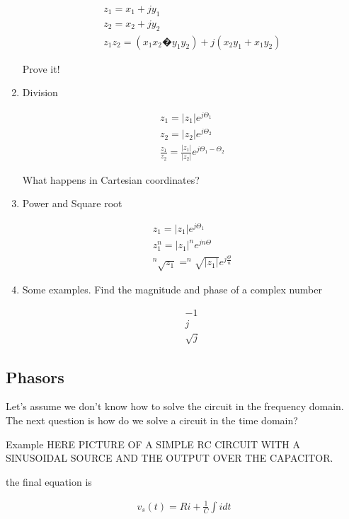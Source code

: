 \begin{enumerate}
\begin{eqnarray}
z_1=x_1 + j y_1 \\
z_2=x_2 + j y_2 \\ 
z_1 z_2 = (x_1 x_2 � y_1 y_2) + j ( x_2 y_1 + x_1 y_2)
\end{eqnarray}
  
Prove it!


\item Division


\begin{eqnarray}
z_1=|z_1| e^{j \Theta_1} \\
z_2=|z_2| e^{j \Theta_2} \\
\frac{z_1}{ z_2} = \frac{|z_1|}{|z_2|} e^{j \Theta_1 -\Theta_2}
\end{eqnarray}
  

What happens in Cartesian coordinates?


\item Power and Square root


\begin{eqnarray}
z_1=|z_1| e^{j \Theta_1} \\
z_1^n=|z_1|^n e^{j n \Theta} \\
^n\sqrt{z_1}= ^n\sqrt{|z_1|} e^{j\frac{\Theta}{n}}
\end{eqnarray}




\item Some examples. Find the magnitude and phase of a complex number


\begin{eqnarray}
-1 \\
j \\
\sqrt{j}
\end{eqnarray}

\end{enumerate}

\subsection{Phasors}

Let's assume we don't know how to solve the circuit in the frequency
domain. The next question is 
how do we solve a circuit in the time domain?

{\large Example}
HERE PICTURE OF A SIMPLE RC CIRCUIT WITH A SINUSOIDAL SOURCE AND THE
OUTPUT OVER THE CAPACITOR.

the final equation is

\begin{eqnarray}
v_s(t) = R i + \frac{1}{C} \int i dt \label{td}
\end{eqnarray} 


